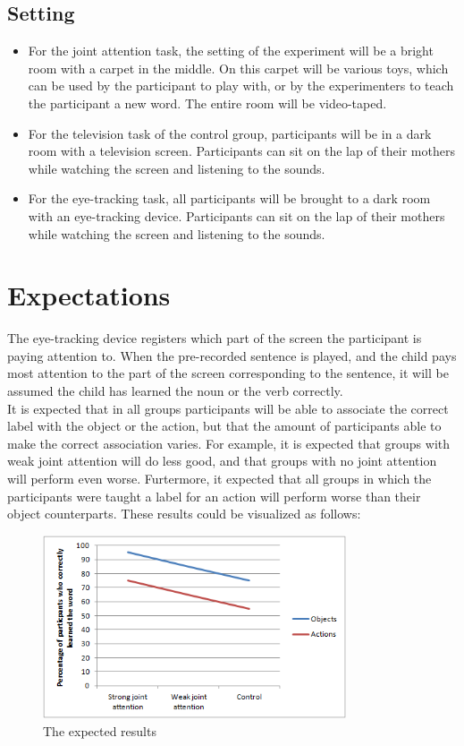 \documentclass[12pt]{article}
\let\stdsection\section
\renewcommand\section{\newpage\stdsection}
\begin{document}
\subsection{Setting}
\begin{itemize}
\item For the joint attention task, the setting of the experiment will be a bright room with a carpet in the middle. On this carpet will be various toys, which can be used by the participant to play with, or by the experimenters to teach the participant a new word. The entire room will be video-taped.
\item For the television task of the control group, participants will be in a dark room with a television screen. Participants can sit on the lap of their mothers while watching the screen and listening to the sounds.
\item For the eye-tracking task, all participants will be brought to a dark room with an eye-tracking device. Participants can sit on the lap of their mothers while watching the screen and listening to the sounds.
\end{itemize}

\section{Expectations} \label{expectations}

The eye-tracking device registers which part of the screen the participant is paying attention to. When the pre-recorded sentence is played, and the child pays most attention to the part of the screen corresponding to the sentence, it will be assumed the child has learned the noun or the verb correctly.\\\indent
It is expected that in all groups participants will be able to associate the correct label with the object or the action, but that the amount of participants able to make the correct association varies. For example, it is expected that groups with weak joint attention will do less good, and that groups with no joint attention will perform even worse. Furtermore, it expected that all groups in which the participants were taught a label for an action will perform worse than their object counterparts. These results could be visualized as follows:

\begin{figure}[htb]
\centering
\includegraphics[width=0.8\textwidth]{graph_elpp.png}
\caption{The expected results}
\label{fig:results}
\end{figure}
\end{document}
